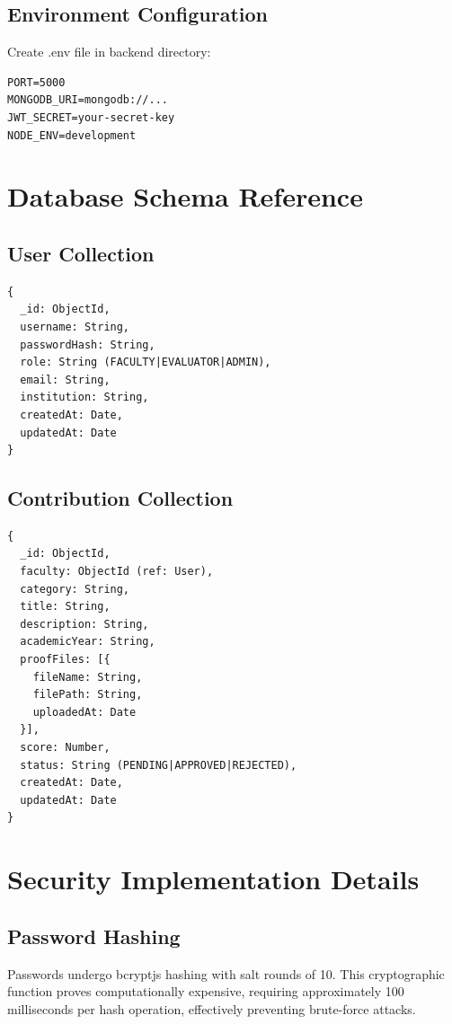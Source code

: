 \documentclass[conference]{IEEEtran}
\begin{document}
\subsection{Environment Configuration}
Create .env file in backend directory:
\begin{verbatim}
PORT=5000
MONGODB_URI=mongodb://...
JWT_SECRET=your-secret-key
NODE_ENV=development
\end{verbatim}

\section{Database Schema Reference}
\label{appx:schema}

\subsection{User Collection}
\begin{verbatim}
{
  _id: ObjectId,
  username: String,
  passwordHash: String,
  role: String (FACULTY|EVALUATOR|ADMIN),
  email: String,
  institution: String,
  createdAt: Date,
  updatedAt: Date
}
\end{verbatim}

\subsection{Contribution Collection}
\begin{verbatim}
{
  _id: ObjectId,
  faculty: ObjectId (ref: User),
  category: String,
  title: String,
  description: String,
  academicYear: String,
  proofFiles: [{
    fileName: String,
    filePath: String,
    uploadedAt: Date
  }],
  score: Number,
  status: String (PENDING|APPROVED|REJECTED),
  createdAt: Date,
  updatedAt: Date
}
\end{verbatim}

\section{Security Implementation Details}
\label{appx:security}

\subsection{Password Hashing}
Passwords undergo bcryptjs hashing with salt rounds of 10. This cryptographic function proves computationally expensive, requiring approximately 100 milliseconds per hash operation, effectively preventing brute-force attacks.
\end{document}
